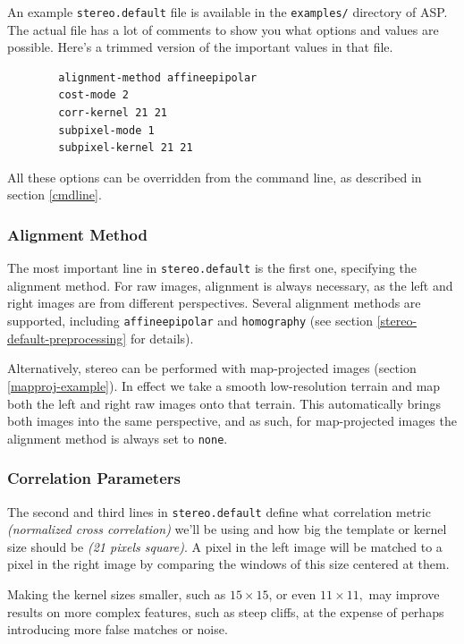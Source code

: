 An example \texttt{stereo.default} file is available in the
\texttt{examples/} directory of \ac{ASP}. The actual file has a lot of
comments to show you what options and values are possible. Here's a
trimmed version of the important values in that file.
\begin{verbatim}
        alignment-method affineepipolar
        cost-mode 2
        corr-kernel 21 21
        subpixel-mode 1
        subpixel-kernel 21 21
\end{verbatim}

All these options can be overridden from the command line, as described
in section \ref{cmdline}.

\subsubsection*{Alignment Method}

The most important line in \texttt{stereo.default} is the
first one, specifying the alignment method. For raw images, alignment is
always necessary, as the left and right images are from different
perspectives. Several alignment methods are supported, including
\texttt{affineepipolar} and \texttt{homography} (see section
\ref{stereo-default-preprocessing} for details).

Alternatively, stereo can be performed with map-projected images
(section \ref{mapproj-example}). In effect we take a smooth
low-resolution terrain and map both the left and right raw images onto
that terrain. This automatically brings both images into the same
perspective, and as such, for map-projected images the alignment method
is always set to \texttt{none}.

\subsubsection*{Correlation Parameters}

The second and third lines in \texttt{stereo.default} define what
correlation metric \textit{(normalized cross correlation)} we'll be
using and how big the template or kernel size should be \textit{(21
pixels square)}. A pixel in the left image will be matched to a pixel in
the right image by comparing the windows of this size centered at them.

Making the kernel sizes smaller, such as $15 \times 15$, or even $11
\times 11,$ may improve results on more complex features, such as steep
cliffs, at the expense of perhaps introducing more false matches or
noise.

